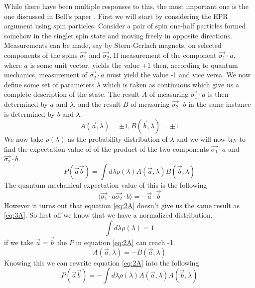 While there have been multiple responses to this, the most important one is the one discussed in Bell's paper \cite{bell}.
First we will start by considering the EPR argument using spin particles. Consider a pair of spin one-half particles formed somehow in the singlet spin state and moving freely in opposite directions. Measurements can be made, say by Stern-Gerlach magnets, on selected components of the spins $\vec{\sigma_1}$ and $\vec{\sigma_2}$,
If measurement of the component $\vec{\sigma_1}\cdot{a}$, where $a$ is some unit vector, yields the value +1 then, according to quantum mechanics, measurement of $\vec{\sigma_2}\cdot{a}$ must yield the value -1 and vice versa.
We now define some set of parameters $\lambda$ which is taken as continuous which give us a complete description of the state. The result $A$ of measuring $\vec{\sigma_1}\cdot{a}$ is then determined by $a$ and $\lambda$, and the result $B$ of measuring $\vec{\sigma_2}\cdot{b}$ in the
same instance is determined by $b$ and $\lambda$.
\begin{equation}
\label{eq:1A} 
A(\vec{a},\lambda) = \pm 1, B(\vec{b},\lambda) = \pm 1 
\end{equation}
We now take $\rho(\lambda)$ as the probability distribution of $\lambda$ and we will now try to find the expectation value of of the product of the two components $\vec{\sigma_1}\cdot{a}$ and $\vec{\sigma_2}\cdot{b}$.
\begin{equation}
\label{eq:2A}
P(\vec{a}\vec{b}) = \int{d\lambda}\rho(\lambda)A(\vec{a},\lambda)B(\vec{b},\lambda)
\end{equation}
The quantum mechanical expectation value of this is the following
\begin{equation}
\label{eq:3A}\langle\vec{\sigma_1}\cdot{a}\vec{\sigma_2}\cdot{b}\rangle = - \vec{a}\cdot\vec{b}
\end{equation}
However it turns out that equation \ref{eq:2A} doesn't give us the same result as \ref{eq:3A}. So first off we know that we have a normalized distribution.
\begin{equation}
\label{eq:4A}
\int{d\lambda}\rho(\lambda) = 1
\end{equation}
if we take $\vec{a} = \vec{b}$ the $P$ in equation \ref{eq:2A} can reach -1.
\begin{equation}
\label{eq:5A}
A(\vec{a},\lambda) = -B(\vec{a},\lambda)
\end{equation}
Knowing this we can rewrite equation \ref{eq:2A} into the following
\begin{equation}
\label{eq:6A}
P(\vec{a}\vec{b}) = -\int{d\lambda}\rho(\lambda)A(\vec{a},\lambda)A(\vec{b},\lambda)
\end{equation}
